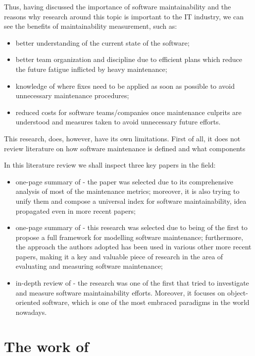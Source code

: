 \documentclass[a4paper,12pt]{article}
\begin{document}
Thus, having discussed the importance of software maintainability and the
reasons why research around this topic is important to the IT industry,
we can see the benefits of maintainability measurement, such as:
  \begin{itemize}
    \item better understanding of the current state of the software;
    \item better team organization and discipline due to efficient plans 
    which reduce the future fatigue inflicted by heavy maintenance;
    \item knowledge of where fixes need to be applied as soon as possible
    to avoid unnecessary maintenance procedures;
    \item reduced costs for software teams/companies once maintenance 
    culprits are understood and measures taken to avoid unnecessary future
    efforts.
  \end{itemize}

This research, does, however, have its own limitations. First of all, it does
not review literature on how software maintenance is defined and what 
components 

In this literature review we shall inspect three key papers in the field:
  \begin{itemize}
    \item one-page summary of \citet{oman1992metrics} - the paper was selected
      due to its comprehensive analysis of most of the maintenance metrics; 
      moreover, it is also trying to unify them and compose a universal index
      for software maintainability, idea propagated even in more recent papers;
    \item one-page summary of \citet{pfleeger1990framework} - this research was
      selected due to being of the first to propose a full framework for modelling
      software maintenance; furthermore, the approach the authors adopted has been
      used in various other more recent papers, making it a key and valuable piece
      of research in the area of evaluating and measuring software maintenance;
    \item in-depth review of \citet{li1993maintenance} - the research was one of the
      first that tried to investigate and measure software maintainability efforts. 
      Moreover, it focuses on object-oriented software, which is one of the most
      embraced paradigms in the world nowadays.
  \end{itemize}

\section{The work of \cite{li1993maintenance}}
\end{document}
